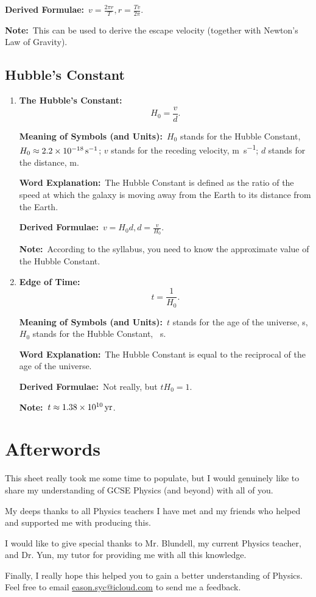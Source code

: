 \documentclass[8pt]{article}
\newcommand{\MeanSymb}{\textbf{Meaning of Symbols (and Units):}\ }
\newcommand{\WordExpl}{\textbf{Word Explanation:}\ }
\newcommand{\DeriForm}{\textbf{Derived Formulae:}\ }
\newcommand{\Note}{\textbf{Note:}\ }
\begin{document}
            \DeriForm \(v = \frac{2\pi r}{T}, r = \frac{Tv}{2\pi}\).

            \Note This can be used to derive the escape velocity (together with Newton's Law of Gravity).

        \subsection{Hubble's Constant}
            \begin{enumerate}
                \item \textbf{The Hubble's Constant:}
                \[
                    H_0 = \frac{v}{d}.
                \]

                \MeanSymb \(H_0\) stands for the Hubble Constant, \(H_0 \approx \qty{2.2 e -18}{\per \second}\); \(v\) stands for the receding velocity, \unit{\metre\per\second}; \(d\) stands for the distance, \unit{\metre}.

                \WordExpl The Hubble Constant is defined as the  ratio of the speed at which the galaxy is moving away from the Earth to its distance from the Earth.

                \DeriForm \(v = H_0 d, d = \frac{v}{H_0}\).

                \Note According to the syllabus, you need to know the approximate value of the Hubble Constant.

                \item \textbf{Edge of Time:}
                \[
                    t = \frac{1}{H_0}.
                \]

                \MeanSymb \(t\) stands for the age of the universe, \unit{\second}, \(H_0\) stands for the Hubble Constant, \unit{\per\second}.

                \WordExpl The Hubble Constant is equal to the reciprocal of the age of the universe.

                \DeriForm Not really, but \(t H_0 = 1\).

                \Note \(t \approx \qty{1.38 e 10}{\mathrm{yr}}\).
            \end{enumerate}

    \section*{Afterwords}
        This sheet really took me some time to populate, but I would genuinely like to share my understanding of GCSE Physics (and beyond) with all of you.
        
        My deeps thanks to all Physics teachers I have met and my friends who helped and supported me with producing this.
        
        I would like to give special thanks to Mr. Blundell, my current Physics teacher, and Dr. Yun, my tutor for providing me with all this knowledge.

        Finally, I really hope this helped you to gain a better understanding of Physics. Feel free to email \href{eason.syc@icloud.com}{eason.syc@icloud.com} to send me a feedback.
\end{document}
